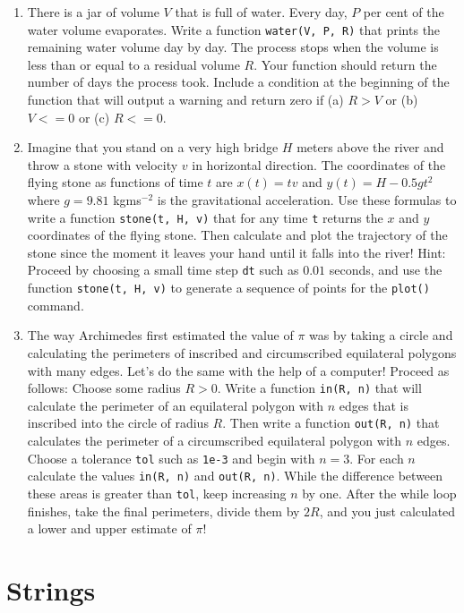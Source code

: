\begin{enumerate}
\item There is a jar of volume $V$ that is full of water. Every day, 
$P$ per cent of the water volume evaporates. Write a function 
{\tt water(V, P, R)} that prints the remaining water volume day
by day. The process stops when the volume is less than or equal to 
a residual volume $R$. Your function should return the number of 
days the process took. Include a condition at the beginning 
of the function that will output a warning and return zero 
if (a) $R > V$ or (b) $V <= 0$ or (c) $R <= 0$.
\item Imagine that you stand on a very high bridge $H$ meters above 
the river and throw a stone with velocity $v$ in horizontal direction. 
The coordinates of the flying stone as functions of time $t$ are
$x(t) = t v$ and $y(t) = H - 0.5gt^2$ where $g = 9.81$ kgms$^{-2}$ is
the gravitational acceleration. Use these formulas to write a function 
{\tt stone(t, H, v)} that for any time {\tt t} returns the $x$ and 
$y$ coordinates of the flying stone. Then calculate and plot the trajectory 
of the stone since the moment it leaves your hand until it falls into the 
river! Hint: Proceed by choosing a small time step {\tt dt} such 
as $0.01$ seconds, and use the function {\tt stone(t, H, v)} to generate 
a sequence of points for the {\tt plot()} command.  
\item The way Archimedes first estimated the value of $\pi$ was 
by taking a circle and calculating the perimeters of inscribed and 
circumscribed equilateral polygons with many edges. Let's do the same 
with the help of a computer! Proceed as follows: Choose some radius 
$R > 0$. Write a function {\tt in(R, n)} that will calculate the perimeter 
of an equilateral polygon with $n$ edges that is inscribed into the
circle of radius $R$. Then write a function {\tt out(R, n)}
that calculates the perimeter of a circumscribed equilateral polygon 
with $n$ edges. Choose a tolerance {\tt tol} such as {\tt 1e-3} and 
begin with $n = 3$. For each $n$ calculate the values {\tt in(R, n)}
and {\tt out(R, n)}. While the difference between these areas is 
greater than {\tt tol}, keep increasing $n$ by one. After the while 
loop finishes, take the final perimeters, divide them by $2 R$, and 
you just calculated a lower and upper estimate of $\pi$! 
\end{enumerate}


\section{Strings} \label{sec:strings}

